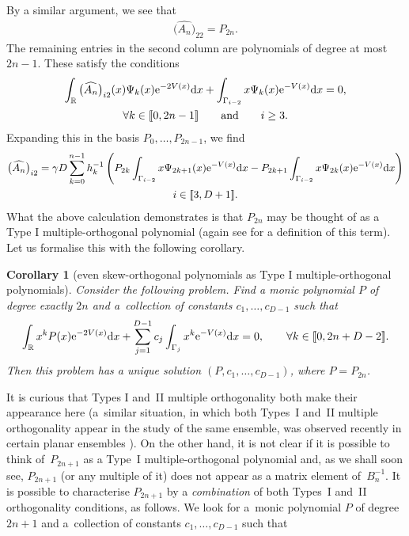 \documentclass[pdftex]{sigma}
\numberwithin{equation}{section}
\newtheorem{Corollary}[Theorem]{Corollary}
\begin{document}
By a similar argument, we see that
\begin{align}\label{22Ahat}
\big(\widehat{A_n}\big)_{22} = P_{2n}.
\end{align}
The remaining entries in the second column are polynomials of degree at most $2n-1$. These satisfy the conditions
\begin{gather*}
\int_\mathbb{R} \big(\widehat{A_n}\big)_{i2}(x) \Psi_k(x) {\rm e}^{-2V(x)} {\rm d}x + \int_{\Gamma_{i-2}} x \Psi_k(x) {\rm e}^{-V(x)} {\rm d}x = 0,\\ \forall k \in [\![0 , 2n-1]\!]\qquad \text{and}\qquad i \geq 3.
\end{gather*}
Expanding this in the basis $P_0, \dots, P_{2n-1}$, we find
\begin{gather}
\big(\widehat{A_{n}}\big)_{i2} =\gamma D \sum_{k=0}^{n-1} h_k^{-1} \left( P_{2k} \int_{\Gamma_{i-2}} x \Psi_{2k +1}(x) {\rm e}^{-V(x)} {\rm d}x - P_{2k+1} \int_{\Gamma_{i-2}} x \Psi_{2k}(x) {\rm e}^{-V(x)} {\rm d}x \right) \nonumber \\
 i \in [\![ 3,D+1]\!]. \label{i2Ahat}
\end{gather}
What the above calculation demonstrates is that $P_{2n}$ may be thought of as a Type I multiple-orthogonal polynomial (again see \cite{Martinez_Finkelshtein_2016} for a definition of this term). Let us formalise this with the following corollary.
\begin{Corollary}[even skew-orthogonal polynomials as Type I multiple-orthogonal polynomials]\label{typeI} Consider the following problem. Find a monic polynomial $P$ of degree exactly $2n$ and a~collection of constants $c_1, \dots, c_{D-1}$ such that
\begin{align*}
\int_{\mathbb{R}} x^k P(x) {\rm e}^{-2V(x)} {\rm d}x + \sum_{j=1}^{D-1} c_j \int_{\Gamma_j} x^k {\rm e}^{-V(x)} {\rm d}x = 0,\qquad \forall k \in [\![0 , 2n+D-2 ]\!].
\end{align*}
Then this problem has a unique solution $(P, c_1, \dots, c_{D-1})$, where $P=P_{2n}$.
\end{Corollary}
It is curious that Types I and~II multiple orthogonality both make their appearance here (a~similar situation, in which both Types~I and~II multiple orthogonality appear in the study of the same ensemble, was observed recently in certain planar ensembles \cite{Berezin_2023,Lee_2019}). On the other hand, it is not clear if it is possible to think of~$P_{2n+1}$ as a Type~I multiple-orthogonal polynomial and, as we shall soon see, $P_{2n+1}$ (or any multiple of it) does not appear as a matrix element of~$B_n^{-1}$. It is possible to characterise $P_{2n+1}$ by a \textit{combination} of both Types~I and~II orthogonality conditions, as follows. We look for a~monic polynomial $P$ of degree $2n+1$ and a~collection of constants $c_1, \dots, c_{D-1}$ such that
\end{document}
